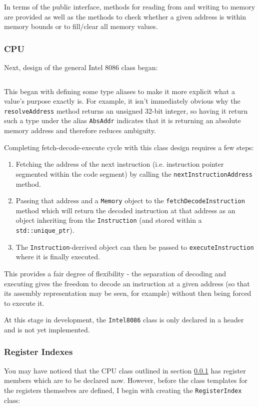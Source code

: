         In terms of the public interface, methods for reading from and writing to memory are provided as well as the methods to check whether a given address is within memory bounds or to fill/clear all memory values.

    \subsubsection{CPU} \label{sec:initial-cpu}
        Next, design of the general Intel 8086 class began:

        \inputminted{c++}{code/initial/intel8086.hpp}

        This began with defining some type aliases to make it more explicit what a value's purpose exactly is. For example, it isn't immediately obvious why the \texttt{resolveAddress} method returns an unsigned 32-bit integer, so having it return such a type under the alias \texttt{AbsAddr} indicates that it is returning an absolute memory address and therefore reduces ambiguity.

        Completing fetch-decode-execute cycle with this class design requires a few steps:
        \begin{enumerate}
            \item Fetching the address of the next instruction (i.e. instruction pointer segmented within the code segment) by calling the \texttt{nextInstructionAddress} method.
            \item Passing that address and a \texttt{Memory} object to the \texttt{fetchDecodeInstruction} method which will return the decoded instruction at that address as an object inheriting from the \texttt{Instruction} (and stored within a \texttt{std::unique\_ptr}).
            \item The \texttt{Instruction}-derrived object can then be passed to \texttt{executeInstruction} where it is finally executed.
        \end{enumerate}
        This provides a fair degree of flexibility - the separation of decoding and executing gives the freedom to decode an instruction at a given address (so that its assembly representation may be seen, for example) without then being forced to execute it.

        At this stage in development, the \texttt{Intel8086} class is only declared in a header and is not yet implemented.
        
    \subsubsection{Register Indexes}
        You may have noticed that the CPU class outlined in section \ref{sec:initial-cpu} has register members which are to be declared now. However, before the class templates for the registers themselves are defined, I begin with creating the \texttt{RegisterIndex} class:

